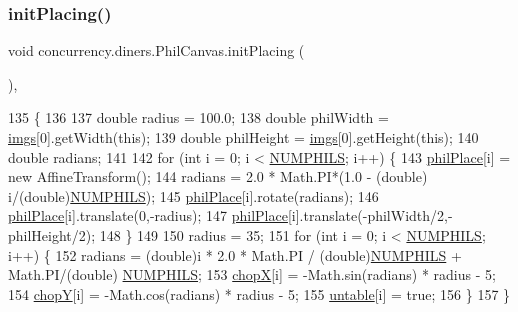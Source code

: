 \subsubsection{\texorpdfstring{init\+Placing()}{initPlacing()}}
{\footnotesize\ttfamily void concurrency.\+diners.\+Phil\+Canvas.\+init\+Placing (\begin{DoxyParamCaption}{ }\end{DoxyParamCaption})\hspace{0.3cm}{\ttfamily [inline]}, {\ttfamily [package]}}


\begin{DoxyCode}
135                        \{
136        
137         \textcolor{keywordtype}{double} radius = 100.0;
138         \textcolor{keywordtype}{double} philWidth  = \mbox{\hyperlink{classconcurrency_1_1diners_1_1_phil_canvas_a107d0c96c4c1050eca2998d5ae198cea}{imgs}}[0].getWidth(\textcolor{keyword}{this});
139         \textcolor{keywordtype}{double} philHeight = \mbox{\hyperlink{classconcurrency_1_1diners_1_1_phil_canvas_a107d0c96c4c1050eca2998d5ae198cea}{imgs}}[0].getHeight(\textcolor{keyword}{this}); 
140         \textcolor{keywordtype}{double} radians;
141 
142         \textcolor{keywordflow}{for} (\textcolor{keywordtype}{int} i = 0; i < \mbox{\hyperlink{classconcurrency_1_1diners_1_1_phil_canvas_a3eeb58e8b150bc1715a708ef38171fd5}{NUMPHILS}}; i++) \{
143             \mbox{\hyperlink{classconcurrency_1_1diners_1_1_phil_canvas_a7bc660c3c92202be5de56022e6c2cf41}{philPlace}}[i] = \textcolor{keyword}{new} AffineTransform();
144             radians = 2.0 * Math.PI*(1.0 - (double) i/(\textcolor{keywordtype}{double})\mbox{\hyperlink{classconcurrency_1_1diners_1_1_phil_canvas_a3eeb58e8b150bc1715a708ef38171fd5}{NUMPHILS}});
145             \mbox{\hyperlink{classconcurrency_1_1diners_1_1_phil_canvas_a7bc660c3c92202be5de56022e6c2cf41}{philPlace}}[i].rotate(radians);
146             \mbox{\hyperlink{classconcurrency_1_1diners_1_1_phil_canvas_a7bc660c3c92202be5de56022e6c2cf41}{philPlace}}[i].translate(0,-radius);
147             \mbox{\hyperlink{classconcurrency_1_1diners_1_1_phil_canvas_a7bc660c3c92202be5de56022e6c2cf41}{philPlace}}[i].translate(-philWidth/2,-philHeight/2);
148        \}     
149             
150         radius = 35;
151         \textcolor{keywordflow}{for} (\textcolor{keywordtype}{int} i = 0; i < \mbox{\hyperlink{classconcurrency_1_1diners_1_1_phil_canvas_a3eeb58e8b150bc1715a708ef38171fd5}{NUMPHILS}}; i++) \{
152             radians  = (double)i * 2.0 * Math.PI / (\textcolor{keywordtype}{double})\mbox{\hyperlink{classconcurrency_1_1diners_1_1_phil_canvas_a3eeb58e8b150bc1715a708ef38171fd5}{NUMPHILS}} + Math.PI/(double)
      \mbox{\hyperlink{classconcurrency_1_1diners_1_1_phil_canvas_a3eeb58e8b150bc1715a708ef38171fd5}{NUMPHILS}};
153             \mbox{\hyperlink{classconcurrency_1_1diners_1_1_phil_canvas_a242029d46b5931d89cd7bf3894905d16}{chopX}}[i] = -Math.sin(radians) * radius - 5;
154             \mbox{\hyperlink{classconcurrency_1_1diners_1_1_phil_canvas_aba4e88ab02194e29db655d0075f549f2}{chopY}}[i] = -Math.cos(radians) * radius - 5;
155             \mbox{\hyperlink{classconcurrency_1_1diners_1_1_phil_canvas_a52cc075fd7ba820c26006a73690a49c1}{untable}}[i] = \textcolor{keyword}{true};
156          \}
157     \}
\end{DoxyCode}
